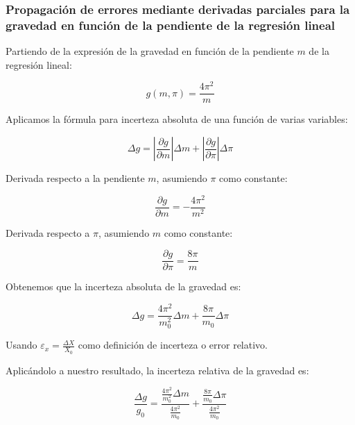 \clearpage
\subsubsection{Propagación de errores mediante derivadas parciales para la gravedad en función de la pendiente de la regresión lineal}
\label{subsubsec:propagacion-errores-g-a-partir-de-la-pendiente}


Partiendo de la expresión de la gravedad en función de la pendiente $m$ de la regresión lineal:

\begin{equation}
    g(m, \pi) = \frac{4\pi^2}{m}
    \label{eq:funcion-gravedad-pendiente}
\end{equation}

Aplicamos la fórmula para incerteza absoluta de una función de varias variables:

\begin{equation}
    \Delta g = \left| \frac{\partial g}{\partial m} \right| \Delta m + \left| \frac{\partial g}{\partial \pi} \right| \Delta \pi
    \label{eq:incerteza-general-gravedad-pendiente}
\end{equation}

Derivada respecto a la pendiente $m$, asumiendo $\pi$ como constante:

\begin{equation}
    \frac{\partial g}{\partial m} = -\frac{4\pi^2}{m^2}
    \label{eq:derivada-pendiente}
\end{equation}

Derivada respecto a $\pi$, asumiendo $m$ como constante:

\begin{equation}
    \frac{\partial g}{\partial \pi} = \frac{8\pi}{m}
    \label{eq:derivada-pi-gravedad}
\end{equation}

Obtenemos que la incerteza absoluta de la gravedad es:

\begin{equation}
    \Delta g = \frac{4\pi^2}{m_0^2} \Delta m + \frac{8\pi}{m_0} \Delta \pi
    \label{eq:incerteza-final-gravedad}
\end{equation}

Usando $\varepsilon_x = \frac{\Delta X}{X_0}$ como definición de incerteza o error relativo.

Aplicándolo a nuestro resultado, la incerteza relativa de la gravedad es:

\begin{equation}
    \frac{\Delta g}{g_0} = \frac{\frac{4\pi^2}{m_0^2} \Delta m}{\frac{4\pi^2}{m_0}} + \frac{\frac{8\pi}{m_0} \Delta \pi}{\frac{4\pi^2}{m_0}}
    \label{eq:incerteza-relativa-desarrollo-gravedad}
\end{equation}

